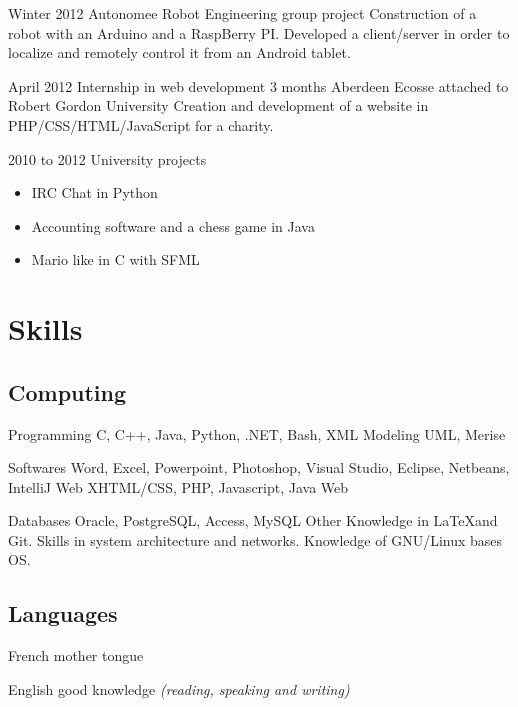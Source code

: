 \documentclass[10pt,a4paper]{moderncv}
\begin{document}
\cventry
	{Winter 2012}
	{Autonomee Robot}
	{}
	{}
	{Engineering group project}
	{Construction of a robot with an Arduino and a RaspBerry PI. Developed a client/server in order to localize and remotely control it from an Android tablet.}

\cventry
	{April 2012}
	{Internship in web development}
	{3 months}
	{Aberdeen Ecosse}
	{attached to Robert Gordon University}
	{Creation and development of a website in PHP/CSS/HTML/JavaScript for a charity.}

\cventry
	{2010 to 2012}
	{University projects}
	{}
	{}
	{}
	{
		\begin{itemize}
			\item IRC Chat in Python
			\item Accounting software and a chess game in Java
			\item Mario like in C with SFML
		\end{itemize}
	}


\section{Skills}

\subsection{Computing}

\cvcomputer
	{Programming}
	{C, C++, Java, Python, .NET, Bash, XML}
	{Modeling}
	{UML, Merise}

\cvcomputer
	{Softwares}
	{Word, Excel, Powerpoint, Photoshop, Visual Studio, Eclipse, Netbeans, IntelliJ}
	{Web}
	{XHTML/CSS, PHP, Javascript, Java Web}

\cvcomputer
	{Databases}
	{Oracle, PostgreSQL, Access, MySQL}
	{Other}
	{Knowledge in \LaTeX and Git. Skills in system architecture and networks. Knowledge of GNU/Linux bases OS.}

\subsection{Languages}

\cvlanguage
	{French}
	{mother tongue}
	{}

\cvlanguage
	{English}
	{good knowledge \textnormal{\textit{(reading, speaking and writing)}}}
	{}
\end{document}
